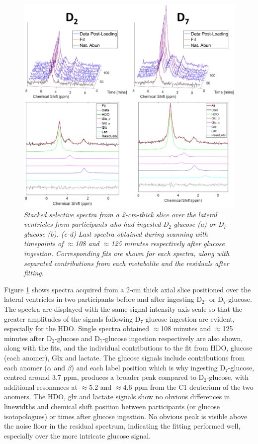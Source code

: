 \documentclass[class=article, crop=false]{standalone}
\begin{document}
\begin{figure}
    \centering
    \includegraphics[width = 1\textwidth]{Figures/Glucose/Selective.png}
    \caption{\textit{Stacked selective spectra from a 2-cm-thick slice over the lateral ventricles from participants who had ingested D$_2$-glucose (a) or D$_7$-glucose (b). (c-d) Last spectra obtained during scanning with timepoints of $\approx$108 and $\approx$125 minutes respectively after glucose ingestion. Corresponding fits are shown for each spectra, along with separated contributions from each metabolite and the residuals after fitting.}}
    \label{fig:Glu:Select}
\end{figure}

Figure \ref{fig:Glu:Select} shows spectra acquired from a 2-cm thick axial slice positioned over the lateral ventricles in two participants before and after ingesting D$_2$- or D$_7$-glucose. The spectra are displayed with the same signal intensity axis scale so that the greater amplitudes of the signals following D$_7$-glucose ingestion are evident, especially for the HDO. Single spectra obtained $\approx$108 minutes and $\approx$125 minutes after D$_2$-glucose and D$_7$-glucose ingestion respectively are also shown, along with the fits, and the individual contributions to the fit from HDO, glucose (each anomer), Glx and lactate. The glucose signals include contributions from each anomer ($\alpha$ and $\beta$) and each label position which is why ingesting D$_7$-glucose, centred around 3.7 ppm, produces a broader peak compared to D$_2$-glucose, with additional resonances at $\approx$5.2 and $\approx$4.6 ppm from the C1 deuterium of the two anomers. The HDO, glx and lactate signals show no obvious differences in linewidths and chemical shift position between participants (or glucose isotopologues) or times after glucose ingestion. No obvious peak is visible above the noise floor in the residual spectrum, indicating the fitting performed well, especially over the more intricate glucose signal.
\end{document}
